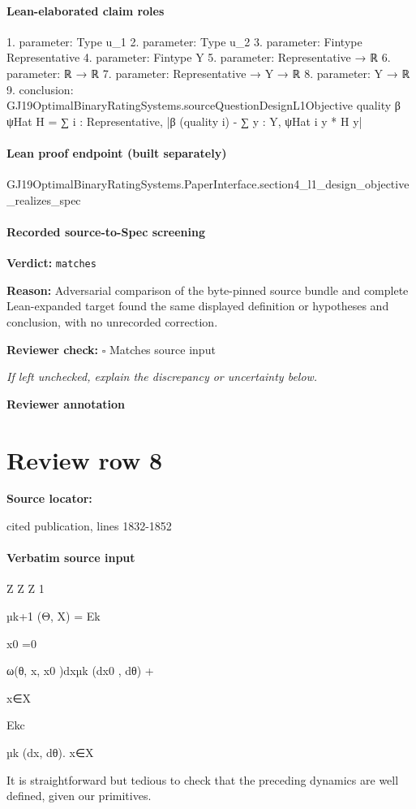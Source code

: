 \documentclass[10pt]{article}
\newcommand{\reviewerbox}{%
  \par\noindent\fbox{\parbox{0.96\linewidth}{\rule{0pt}{0.38in}}}\par
}
\newcommand{\reviewmatch}[1]{%
  \par\noindent\textbf{Reviewer check:} $\square$\; #1\par
  \noindent\emph{If left unchecked, explain the discrepancy or uncertainty below.}\par
}
\begin{document}
\paragraph{Lean-elaborated claim roles}\begin{ReviewVerbatim}
1. parameter: Type u_1
2. parameter: Type u_2
3. parameter: Fintype Representative
4. parameter: Fintype Y
5. parameter: Representative → ℝ
6. parameter: ℝ → ℝ
7. parameter: Representative → Y → ℝ
8. parameter: Y → ℝ
9. conclusion: GJ19OptimalBinaryRatingSystems.sourceQuestionDesignL1Objective quality β ψHat H =
  ∑ i : Representative, |β (quality i) - ∑ y : Y, ψHat i y * H y|
\end{ReviewVerbatim}

\paragraph{Lean proof endpoint (built separately)}\begin{ReviewVerbatim}
GJ19OptimalBinaryRatingSystems.PaperInterface.section4_l1_design_objective_realizes_spec
\end{ReviewVerbatim}

\paragraph{Recorded source-to-Spec screening}
\textbf{Verdict:} \texttt{matches}
\\
{\raggedright
\textbf{Reason:} Adversarial comparison of the byte-\allowbreak{}pinned source bundle and complete Lean-\allowbreak{}expanded target found the same displayed definition or hypotheses and conclusion, with no unrecorded correction.\allowbreak{}
\par}
\reviewmatch{Matches source input}
\noindent\textbf{Reviewer annotation}\par
\reviewerbox
\clearpage
\hypertarget{source-claim-6724e8b8f279b968}{}
\section*{Review row 8}
\textbf{Source locator:} {\footnotesize\raggedright cited publication, lines 1832-\allowbreak{}1852\par}
\paragraph{Verbatim source input}
\begin{ReviewVerbatim}
Z
Z Z
1

µk+1 (Θ, X) =
Ek

x0 =0

ω(θ, x, x0 )dxµk (dx0 , dθ) +

x∈X

Ekc

µk (dx, dθ).
x∈X

It is straightforward but tedious to check that the preceding dynamics are well defined, given our
primitives.
\end{ReviewVerbatim}
\end{document}
